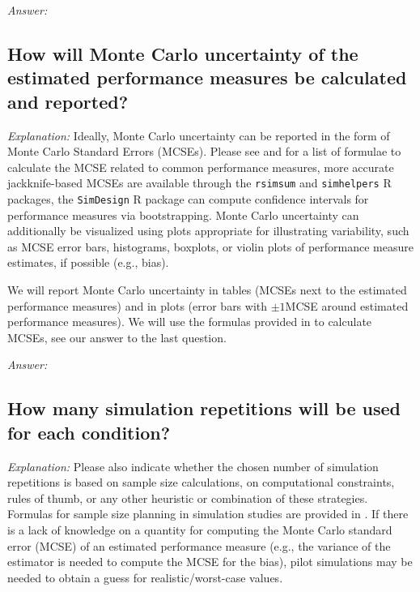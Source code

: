 \documentclass[12pt]{article}
\begin{document}
\textit{Answer:}

\subsection{How will Monte Carlo uncertainty of the estimated performance measures be calculated and reported?}

\textit{Explanation:} Ideally, Monte Carlo uncertainty can be reported in the form of Monte Carlo Standard Errors (MCSEs). Please see \textcite{Siepe2023} and \textcite{Morris2019} for a list of formulae to calculate the MCSE related to common performance measures, more accurate jackknife-based MCSEs are available through the \texttt{rsimsum} \parencite{Gasparini2018} and \texttt{simhelpers} \parencite{Simhelpers2022} R packages, the \texttt{SimDesign} \parencite{Chalmers2020} R package can compute confidence intervals for performance measures via bootstrapping. Monte Carlo uncertainty can additionally be visualized using plots appropriate for illustrating variability, such as MCSE error bars, histograms, boxplots, or violin plots of performance measure estimates, if possible (e.g., bias).

\begin{examplebox}
We will report Monte Carlo uncertainty in tables (MCSEs next to the estimated performance measures) and in plots (error bars with $\pm 1$MCSE around estimated performance measures). We will use the formulas provided in \textcite{Siepe2023} to calculate MCSEs, see our answer to the last question.
\end{examplebox}

\textit{Answer:}

\subsection{How many simulation repetitions will be used for each condition?}

\textit{Explanation:} Please also indicate whether the chosen number of simulation repetitions is based on sample size calculations, on computational constraints, rules of thumb, or any other heuristic or combination of these strategies. Formulas for sample size planning in simulation studies are provided in \textcite{Siepe2023}. If there is a lack of knowledge on a quantity for computing the Monte Carlo standard error (MCSE) of an estimated performance measure (e.g., the variance of the estimator is needed to compute the MCSE for the bias), pilot simulations may be needed to obtain a guess for realistic/worst-case values.
\end{document}
